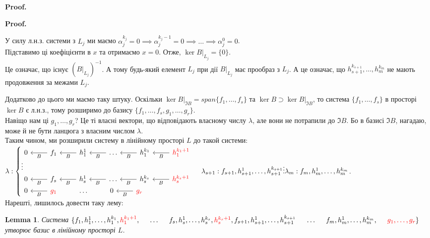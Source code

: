 \documentclass[a4paper, 10pt]{article}
\makeatletter
\theoremstyle{theoremdd}
\newtheorem{lemma}[theorem]{Lemma}
\renewenvironment{proof}[1][Proof.\\]{\par
\pushQED{\hfill \qed}%
\normalfont \topsep6\p@\@plus6\p@\relax
\trivlist
\item\relax
{\bfseries
#1\@addpunct{.}}\hspace\labelsep\ignorespaces
}{%
\popQED\endtrivlist\@endpefalse
}
\makeatother
\begin{document}
\begin{proof}
\begin{proof}
У силу л.н.з. системи з $L_j$ ми маємо $\alpha_j^{k_j} = 0 \implies \alpha_j^{k_j-1} = 0 \implies \dots \implies \alpha_j^0 = 0$.\\
Підставимо ці коефіцієнти в $x$ та отримаємо $x = 0$. Отже, $\ker B|_{L_j} = \{0\}$.\\
Це означає, що існує $(B|_{L_j})^{-1}$. А тому будь-який елемент $L_j$ при дії $B|_{L_j}$ має прообраз з $L_j$. А це означає, що $h_{s+1}^{k_{s+1}},\dots,h_m^{k_m}$ не мають продовження за межами $L_{j}$.
\end{proof}

Додатково до цього ми маємо таку штуку. Оскільки $\ker B|_{\Im B} = span \{f_1,\dots,f_s\}$ та $\ker B \supset \ker B|_{\Im B}$, то система $\{f_1,\dots,f_s\}$ в просторі $\ker B$ є л.н.з., тому розширимо до базису $\{f_1,\dots,f_s,g_1,\dots,g_r\}$.\\
Навіщо нам ці $g_1,\dots,g_r$? Це ті власні вектори, що відповідають власному числу $\lambda$, але вони не потрапили до $\Im B$. Бо в базисі $\Im B$, нагадаю, може й не бути ланцюга з власним числом $\lambda$.
\bigskip \\
Таким чином, ми розширили систему в лінійному просторі $L$ до такой системи:\\
$ \lambda: \begin{cases}
\begin{tikzcd}
0 & f_1 \arrow{l}{B} & h_1^1 \arrow{l}{B} & \dots \arrow{l}{B} & h_1^{k_1} \arrow{l}{B} & \textcolor{red}{h_1^{k_1+1}} \arrow{l}{B}
\end{tikzcd}\\
\vdots \\
\begin{tikzcd}
0 & f_s \arrow{l}{B} & h_s^1 \arrow{l}{B} & \dots \arrow{l}{B} & h_s^{k_s} \arrow{l}{B} & \textcolor{red}{h_s^{k_s+1}} \arrow{l}{B}
\end{tikzcd}\\
\begin{tikzcd}
0 & \textcolor{red}{g_1} \arrow{l}{B} & \dots & 0 & \textcolor{red}{g_r} \arrow{l}{B} &
\end{tikzcd}
\end{cases}
\\
\lambda_{s+1}: f_{s+1}, h_{s+1}^1,\dots,h_{s+1}^{k_{s+1}}\\
\vdots\\
\lambda_m: f_{m}, h_{m}^1,\dots,h_{m}^{k_{m}}
$.\\
Нарешті, лишилось довести таку лему:
\begin{lemma}
Система $\{f_1,h_1^1,\dots,h_1^{k_1},\textcolor{red}{h_1^{k_1+1}}, \hspace{0.5cm} \dots \hspace{0.5cm} f_s, h_s^{1}, \dots,h_s^{k_s}, \textcolor{red}{h_s^{k_s+1}}, \\ f_{s+1}, h_{s+1}^1, \dots, h_{s+1}^{k_{s+1}} \hspace{0.5cm} \dots \hspace{0.5cm} f_{m}, h_{m}^1, \dots, h_{m}^{k_m}, \hspace{0.5cm} \textcolor{red}{g_1, \dots, g_r}\}$ утворює базис в лінійному просторі $L$.
\end{lemma}


\end{proof}
\end{document}

